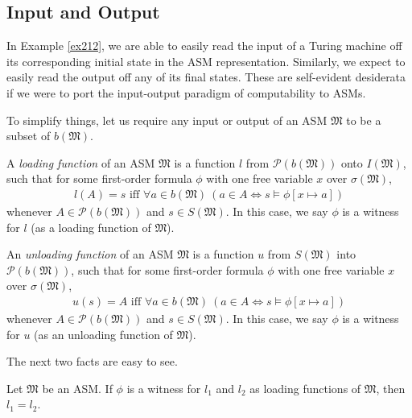 \documentclass[12pt]{article}
\numberwithin{equation}{section}
\begin{document}
\subsection{Input and Output}

In Example \ref{ex212}, we are able to easily read the input of a Turing machine off its corresponding initial state in the ASM representation. Similarly, we expect to easily read the output off any of its final states. These are self-evident desiderata if we were to port the input-output paradigm of computability to ASMs. 

To simplify things, let us require any input or output of an ASM $\mathfrak{M}$ to be a subset of $b(\mathfrak{M})$.

\begin{defi}
A \emph{loading function} of an ASM $\mathfrak{M}$ is a function $l$ from $\mathcal{P}(b(\mathfrak{M}))$ onto $I(\mathfrak{M})$, such that for some first-order formula $\phi$ with one free variable $x$ over $\sigma(\mathfrak{M})$,
\begin{align*}
    l(A) = s \text{ iff } \forall a \in b(\mathfrak{M}) \ (a \in A \iff s \models \phi[x \mapsto a])
\end{align*}
whenever $A \in \mathcal{P}(b(\mathfrak{M}))$ and $s \in S(\mathfrak{M})$. In this case, we say $\phi$ is a witness for $l$ (as a loading function of $\mathfrak{M}$).
\end{defi}

\begin{defi}
An \emph{unloading function} of an ASM $\mathfrak{M}$ is a function $u$ from $S(\mathfrak{M})$ into $\mathcal{P}(b(\mathfrak{M}))$, such that for some first-order formula $\phi$ with one free variable $x$ over $\sigma(\mathfrak{M})$,
\begin{align*}
    u(s) = A \text{ iff } \forall a \in b(\mathfrak{M}) \ (a \in A \iff s \models \phi[x \mapsto a])
\end{align*}
whenever $A \in \mathcal{P}(b(\mathfrak{M}))$ and $s \in S(\mathfrak{M})$. In this case, we say $\phi$ is a witness for $u$ (as an unloading function of $\mathfrak{M}$).
\end{defi}

The next two facts are easy to see.

\begin{fact}\label{fact215}
Let $\mathfrak{M}$ be an ASM. If $\phi$ is a witness for $l_1$ and $l_2$ as loading functions of $\mathfrak{M}$, then $l_1 = l_2$.
\end{fact}
\end{document}
